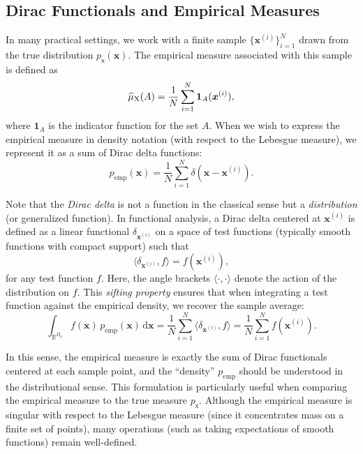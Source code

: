 \documentclass[wcp]{jmlr} %
\newcommand{\vv}[1]{\boldsymbol{#1}}
\newcommand{\mm}[1]{\mathrm{#1}}
\newcommand{\rv}[1]{\mathsf{#1}}
\newcommand{\vrv}[1]{\vv{\rv{#1}}}
\begin{document}
\subsection*{Dirac Functionals and Empirical Measures}

In many practical settings, we work with a finite sample \(\{\vv{x}^{(i)}\}_{i=1}^N\) drawn from the true distribution \(p_{\vrv{x}}(\vv{x})\). The empirical measure associated with this sample is defined as
\begin{equation}
    \ELaw[\mm{X}](A) = \frac{1}{N} \sum_{i=1}^N \mathbf{1}_A(\vv{x}^{(i)}),
\end{equation}
where \(\mathbf{1}_A\) is the indicator function for the set \(A\). When we wish to express the empirical measure in density notation (with respect to the Lebesgue measure), we represent it as a sum of Dirac delta functions:
\begin{equation}
    p_{\text{emp}}(\vv{x}) = \frac{1}{N} \sum_{i=1}^N \delta(\vv{x}-\vv{x}^{(i)}).
\end{equation}

Note that the \emph{Dirac delta} is not a function in the classical sense but a \emph{distribution} (or generalized function). In functional analysis, a Dirac delta centered at \(\vv{x}^{(i)}\) is defined as a linear functional \(\delta_{\vv{x}^{(i)}}\) on a space of test functions (typically smooth functions with compact support) such that
\begin{equation}
    \langle \delta_{\vv{x}^{(i)}}, f \rangle = f(\vv{x}^{(i)}),
\end{equation}
for any test function \(f\). Here, the angle brackets \(\langle \cdot,\cdot \rangle\) denote the action of the distribution on \(f\). This \emph{sifting property} ensures that when integrating a test function against the empirical density, we recover the sample average:
\begin{equation}
    \int_{\mathbb{R}^{D_{\vrv{x}}}} f(\vv{x})\,p_{\text{emp}}(\vv{x})\,\mathrm{d}\vv{x}
    = \frac{1}{N} \sum_{i=1}^N \langle \delta_{\vv{x}^{(i)}}, f \rangle
    = \frac{1}{N} \sum_{i=1}^N f(\vv{x}^{(i)}).
\end{equation}

In this sense, the empirical measure is exactly the sum of Dirac functionals centered at each sample point, and the “density” \(p_{\text{emp}}\) should be understood in the distributional sense. This formulation is particularly useful when comparing the empirical measure to the true measure \(p_{\vrv{x}}\). Although the empirical measure is singular with respect to the Lebesgue measure (since it concentrates mass on a finite set of points), many operations (such as taking expectations of smooth functions) remain well-defined.
\end{document}
